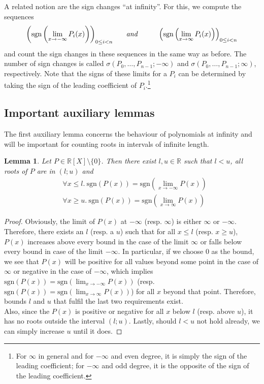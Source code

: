\documentclass[11pt,a4paper,oneside]{article}
\newtheorem{lemma}[definition]{Lemma}
\newcommand{\RR}{\mathbb{R}}
\newcommand{\sgn}{\mathrm{sgn}}
\begin{document}
A related notion are the sign changes \enquote{at infinity}. For this, we compute the sequences
$$\left(\sgn\left(\lim\limits_{x\to -\infty} P_i(x)\right)\right)_{0\leq i < n}\hskip6mm\textit{and}\hskip10mm
\left(\sgn\left(\lim\limits_{x\to \infty} P_i(x)\right)\right)_{0\leq i < n}$$
and count the sign changes in these sequences in the same way as before. The number of sign changes is called $\sigma(P_0,\ldots,P_{n-1};-\infty)$ and $\sigma(P_0,\ldots,P_{n-1};\infty)$, respectively. Note that the signs of these limits for a $P_i$ can be determined by taking the sign of the leading coefficient of $P_i$.\footnote{For $\infty$ in general and for $-\infty$ and even degree, it is simply the sign of the leading coefficient; for $-\infty$ and odd degree, it is the opposite of the sign of the leading coefficient.}

\subsection{Important auxiliary lemmas}
\label{sec:aux_lemmas}

The first auxiliary lemma concerns the behaviour of polynomials at infinity and will be important for counting roots in intervals of infinite length.

\begin{lemma}\label{thm:limits}
Let $P\in\RR[X]\setminus\{0\}$. Then there exist $l,u\in\RR$ such that $l<u$, all roots of $P$ are in $(l;u)$ and
\begin{align*}
&\forall x\leq l.\ \sgn(P(x)) = \sgn\left(\lim\limits_{x\to -\infty} P(x)\right)\\
&\forall x\geq u.\ \sgn(P(x)) = \sgn\left(\lim\limits_{x\to \infty} P(x)\right)
\end{align*}
\end{lemma}
\begin{proof}
Obviously, the limit of $P(x)$ at $-\infty$ (resp. $\infty$) is either $\infty$ or $-\infty$. Therefore, there exists an $l$ (resp. a $u$) such that for all $x\leq l$ (resp. $x\geq u$), $P(x)$ increases above \mbox{every} bound in the case of the limit $\infty$ or falls below every bound in case of the limit $-\infty$. In particular, if we choose 0 as the bound, we see that $P(x)$ will be positive for all \mbox{values} beyond some point in the case of $\infty$ or negative in the case of $-\infty$, which implies $\sgn(P(x)) = \sgn(\lim_{x\to -\infty} P(x))$ (resp. $\sgn(P(x)) = \sgn(\lim_{x\to \infty} P(x))$) for all $x$ beyond that point. Therefore, bounds $l$ and $u$ that fulfil the last two requirements exist.\\
Also, since the $P(x)$ is positive or negative for all $x$ below $l$ (resp. above $u$), it has no roots outside the interval $(l;u)$. Lastly, should $l<u$ not hold already, we can simply increase $u$ until it does.
\end{proof}\vskip3mm
\end{document}
